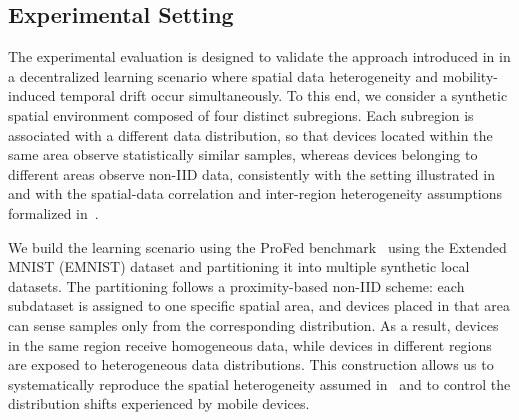 \documentclass[conference]{IEEEtran}
\theoremstyle{plain}
\theoremstyle{definition}
\begin{document}
\subsection{Experimental Setting}


The experimental evaluation is designed to validate the approach
 introduced in  in a decentralized learning scenario where
 spatial data heterogeneity and mobility-induced temporal drift occur simultaneously.
%
To this end,
 we consider a synthetic spatial environment composed of four distinct subregions.
%
Each subregion is associated with a different data distribution,
 so that devices located within the same area observe statistically similar samples,
 whereas devices belonging to different areas observe non-IID data,
 consistently with the setting illustrated in~
 and with the spatial-data correlation and inter-region heterogeneity assumptions
 formalized in~.

We build the learning scenario using the ProFed benchmark~\cite{DBLP:journals/jors/DominiIALV26}
 using the Extended MNIST (EMNIST) dataset and partitioning it into
 multiple synthetic local datasets.
%
The partitioning follows a proximity-based non-IID scheme:
 each subdataset is assigned to one specific spatial area,
 and devices placed in that area can sense samples only from the corresponding distribution.
%
As a result, devices in the same region receive homogeneous data,
 while devices in different regions are exposed to heterogeneous data distributions.
%
This construction allows us to systematically reproduce the spatial heterogeneity
 assumed in~ and
 to control the distribution shifts experienced by mobile devices.

\end{document}
